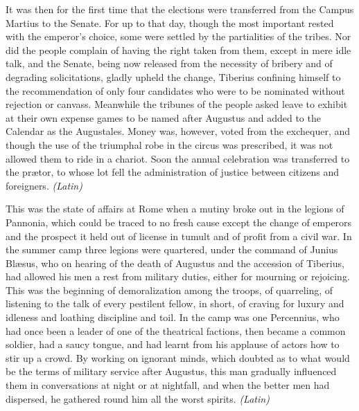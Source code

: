 
It was then for the first time that the elections were transferred from the Campus Martius to the Senate. For up to that day, though the most important rested with the emperor's choice, some were settled by the partialities of the tribes. Nor did the people complain of having the right taken from them, except in mere idle talk, and the Senate, being now released from the necessity of bribery and of degrading solicitations, gladly upheld the change, Tiberius confining himself to the recommendation of only four candidates who were to be nominated without rejection or canvass. Meanwhile the tribunes of the people asked leave to exhibit at their own expense games to be named after Augustus and added to the Calendar as the Augustales. Money was, however, voted from the exchequer, and though the use of the triumphal robe in the circus was prescribed, it was not allowed them to ride in a chariot. Soon the annual celebration was transferred to the prætor, to whose lot fell the administration of justice between citizens and foreigners. \emph{(Latin)}


This was the state of affairs at Rome when a mutiny broke out in the legions of Pannonia, which could be traced to no fresh cause except the change of emperors and the prospect it held out of license in tumult and of profit from a civil war. In the summer camp three legions were quartered, under the command of Junius Blæsus, who on hearing of the death of Augustus and the accession of Tiberius, had allowed his men a rest from military duties, either for mourning or rejoicing. This was the beginning of demoralization among the troops, of quarreling, of listening to the talk of every pestilent fellow, in short, of craving for luxury and idleness and loathing discipline and toil. In the camp was one Percennius, who had once been a leader of one of the theatrical factions, then became a common soldier, had a saucy tongue, and had learnt from his applause of actors how to stir up a crowd. By working on ignorant minds, which doubted as to what would be the terms of military service after Augustus, this man gradually influenced them in conversations at night or at nightfall, and when the better men had dispersed, he gathered round him all the worst spirits. \emph{(Latin)}


